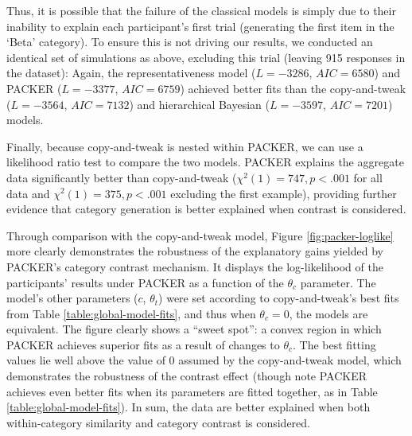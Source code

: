 \documentclass[12pt]{article}
\begin{document}
\begin{flushleft}
Thus, it is possible that the failure of the classical models is simply due to
their inability to explain each participant's first trial (generating the first
item in the `Beta' category). To ensure this is not driving our results, we
conducted an identical set of simulations as above, excluding this trial
(leaving 915 responses in the dataset): Again, the representativeness model ($L
= -3286$, $AIC = 6580$) and PACKER ($L = -3377$,
$AIC = 6759$) achieved better fits than the copy-and-tweak ($L = -3564$,
$AIC = 7132$) and hierarchical Bayesian ($L = -3597$, $AIC = 7201$) models.

Finally, because copy-and-tweak is nested within PACKER, we can use a likelihood
ratio test to compare the two models. PACKER explains the aggregate data
significantly better than copy-and-tweak ($\chi^2(1) = 747, p < .001$ for all
data and $\chi^2(1) = 375, p < .001$ excluding the first example), providing
further evidence that category generation is better explained when contrast is
considered.

Through comparison with the copy-and-tweak model, Figure
\ref{fig:packer-loglike} more clearly demonstrates the robustness of the
explanatory gains yielded by PACKER's category contrast mechanism. It displays
the log-likelihood of the participants' results under PACKER as a function of
the $\theta_c$ parameter. The model's other parameters ($c$,
$\theta_t$) were set according to copy-and-tweak's best fits from Table
\ref{table:global-model-fits}, and thus when $\theta_c=0$, the models are
equivalent. The figure clearly shows a ``sweet spot'': a convex region in which
PACKER achieves superior fits as a result of changes to $\theta_c$. The
best fitting values lie well above the value of 0 assumed by the copy-and-tweak
model, which demonstrates the robustness of the contrast effect (though note
PACKER achieves even better fits when its parameters are fitted together, as in
Table \ref{table:global-model-fits}). In sum, the data are better explained when
both within-category similarity and category contrast is considered.


\end{flushleft}
\end{document}
